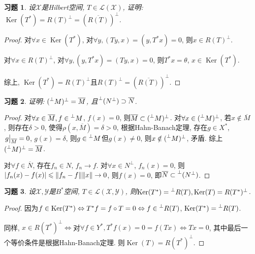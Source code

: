 \documentclass[a4paper,oneside,12pt]{ctexart}
\theoremstyle{plain}
\newtheorem{exercise}{习题}
\theoremstyle{nonumberplain}
\theoremstyle{nonumberplain}
\newtheorem{proof}{证明}
\newcommand{\sX}{\mathscr{X}}
\newcommand{\sY}{\mathscr{Y}}
\newcommand{\sL}{\mathscr{L}}
\newcommand{\leftperp}{\prescript{\perp}{}}
\DeclareMathOperator{\Ker}{Ker}
\begin{document}
    \begin{exercise}
        \label{ex:3 on note}
        设$\sX$是Hilbert空间, $T\in\sL(\sX)$, 证明: $\Ker(T^\ast)=R(T)^\perp=\left(\overline{R(T)}\right)^\perp$.
    \end{exercise}

    \begin{proof}
        对$\forall x\in\Ker(T^\ast)$, 对$\forall y,(Ty,x)=(y,T^\ast x)=0$, 则$x\in R(T)^\perp$. 
        
        对$\forall x\in R(T)^\perp$, 对$\forall y, (y,T^\ast x)=(Ty,x)=0$, 则$T^\ast x=\theta$, $x\in\Ker(T^\ast)$.

        综上, $\Ker(T^\ast)=R(T)^\perp$且$R(T)^\perp=\left(\overline{R(T)}\right)^\perp$.
    \end{proof}

    \begin{exercise}
        \label{ex:4 on note}
        证明: $(\leftperp M)^\perp=\overline{M}$, 且$\leftperp (N^\perp)\supset \overline{N}$.
    \end{exercise}

    \begin{proof}
        对$\forall x\in\overline{M}, f\in\leftperp M$, $f(x)=0$, 则$\overline{M}\subset (\leftperp M)^\perp$. 对$\forall x\in (\leftperp M)^\perp$, 
        若$x\notin \overline{M}$, 则存在$\delta>0$, 使得$\rho(x,\overline{M})=\delta>0$, 根据Hahn-Banach定理, 存在$g\in X^\ast$, $\eval{g}_{\overline{M}}=0$, 
        $g(x)=\delta$, 则$g\in\leftperp M$但$g(x)\neq 0$, 则$x\notin (\leftperp M)^\perp$, 矛盾. 综上$(\leftperp M)^\perp=\overline{M}$. 

        对$\forall f\in\overline{N}$, 存在$f_n\in N$, $f_n\to f$. 对$\forall x\in N^\perp$, $f_n(x)=0$, 则$\abs{f_n(x)-f(x)}\leqslant \norm{f_n-f}\norm{x}\to 0$, 
        则$f(x)=0$, 即$\overline{N}\subset\leftperp(N^\perp)$.
    \end{proof}

    \begin{exercise}
        \label{ex:5 on note}
        设$\sX,\sY$是$B^\ast$空间, $T\in\sL(\sX,\sY)$, 则$\Ker(T^\ast)=\leftperp R(T),\Ker(T)=R(T^\ast)^\perp$.
    \end{exercise}

    \begin{proof}
        因为$f\in\Ker(T^\ast)\Leftrightarrow T^\ast f=f\circ T=0\Leftrightarrow f\in\leftperp R(T)$, $\Ker(T^\ast)=\leftperp R(T)$.

        同样, $x\in R(T^\ast)^\perp\Leftrightarrow $对$\forall f\in Y^\ast,T^\ast f(x)=0=f(Tx)\Leftrightarrow Tx=0$, 其中最后一个等价条件是根据Hahn-Banach定理.
        则$\Ker(T)=R(T^\ast)^\perp$.
    \end{proof}
\end{document}
